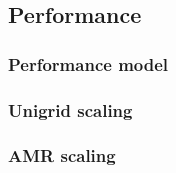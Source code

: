 
\subsection{Performance}
\label{sec.performance}

\subsubsection{Performance model }


\subsubsection{Unigrid scaling }


\subsubsection{AMR scaling }

